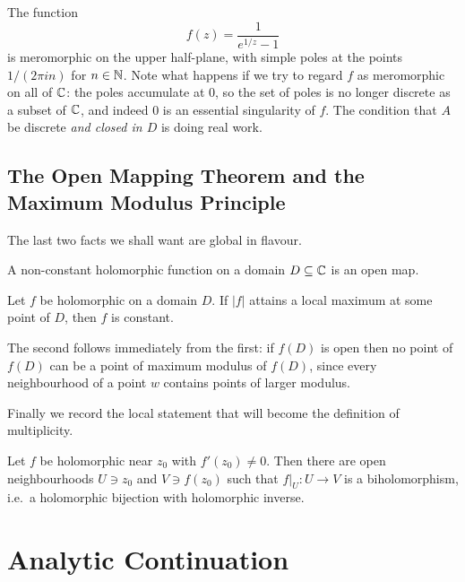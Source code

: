 \documentclass[a4paper]{scrartcl}
\begin{document}
\begin{example}
	The function
	$$
	f(z) = \frac{1}{e^{1/z} - 1}
	$$
	is meromorphic on the upper half-plane, with simple poles at the points
	$1/(2\pi i n)$ for $n \in \mathbb{N}$. Note what happens if we try to regard $f$ as meromorphic
	on all of $\mathbb{C}$: the poles accumulate at $0$, so the set of poles is no longer discrete
	as a subset of $\mathbb{C}$, and indeed $0$ is an essential singularity of $f$. The condition
	that $A$ be discrete \emph{and closed in $D$} is doing real work.
\end{example}

\subsection{The Open Mapping Theorem and the Maximum Modulus Principle}

The last two facts we shall want are global in flavour.

\begin{theorem}\label{thm:omtplane}
	A non-constant holomorphic function on a domain $D \subseteq \mathbb{C}$ is an open map.
\end{theorem}

\begin{theorem}\label{thm:maxmodplane}
	Let $f$ be holomorphic on a domain $D$. If $|f|$ attains a local maximum at some
	point of $D$, then $f$ is constant.
\end{theorem}

The second follows immediately from the first: if $f(D)$ is open then no point of $f(D)$
can be a point of maximum modulus of $f(D)$, since every neighbourhood of a point $w$
contains points of larger modulus.

Finally we record the local statement that will become the definition of multiplicity.

\begin{theorem}\label{thm:ift}
	Let $f$ be holomorphic near $z_0$ with $f'(z_0) \neq 0$. Then there are open
	neighbourhoods $U \ni z_0$ and $V \ni f(z_0)$ such that $f|_U : U \to V$ is a
	biholomorphism, i.e.\ a holomorphic bijection with holomorphic inverse.
\end{theorem}

\section{Analytic Continuation}
\end{document}
